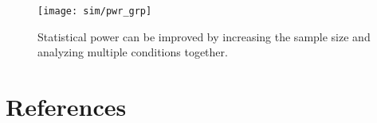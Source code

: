 \documentclass{mcp}
\begin{document}
\begin{figure}[h!]
\centering
\texttt{[image: sim/pwr\_grp]}
\caption{Statistical power can be improved by increasing the sample size and analyzing multiple conditions together. \label{fig:pwr_grp}}
\end{figure}


\clearpage
\section*{References}



\end{document}
